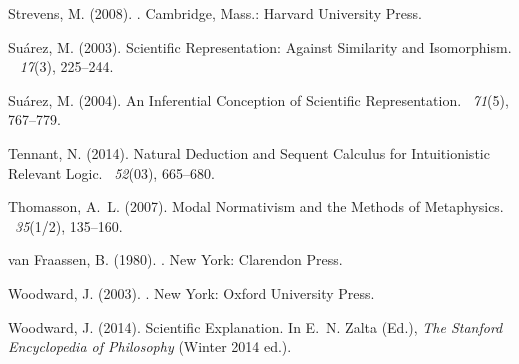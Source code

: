 \documentclass[natbib]{svjour3}                     %
\begin{document}
\begin{thebibliography}{19}
Strevens, M. (2008).
.
\newblock Cambridge, Mass.: Harvard University Press.

Su\'arez, M. (2003).
\newblock Scientific Representation: Against Similarity and Isomorphism.
~{\em
  17\/}(3), 225--244.

Su\'arez, M. (2004).
\newblock An Inferential Conception of Scientific Representation.
~{\em 71\/}(5), 767--779.

Tennant, N. (2014).
\newblock Natural Deduction and Sequent Calculus for Intuitionistic Relevant
  Logic.
~{\em 52\/}(03), 665--680.

Thomasson, A.~L. (2007).
\newblock Modal Normativism and the Methods of Metaphysics.
~{\em 35\/}(1/2), 135--160.

van Fraassen, B. (1980).
.
\newblock New York: Clarendon Press.

Woodward, J. (2003).
.
\newblock New York: Oxford University Press.

Woodward, J. (2014).
\newblock Scientific Explanation.
\newblock In E.~N. Zalta (Ed.), {\em The Stanford Encyclopedia of Philosophy\/}
  (Winter 2014 ed.).

\end{thebibliography}
\end{document}
